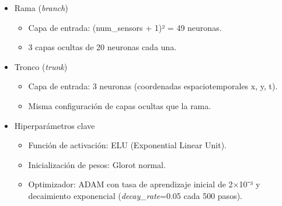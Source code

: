 \documentclass[
  spanish,
  us-letterpaper,
]{scrreprt}
\providecommand{\tightlist}{%
  \setlength{\itemsep}{0pt}\setlength{\parskip}{0pt}}
\theoremstyle{definition}
\theoremstyle{plain}
\theoremstyle{remark}
\begin{document}
\begin{itemize}
\tightlist
\item
  Rama (\emph{branch})

  \begin{itemize}
  \tightlist
  \item
    Capa de entrada: (num\_sensors + 1)² = 49 neuronas.
  \item
    3 capas ocultas de 20 neuronas cada una.
  \end{itemize}
\item
  Tronco (\emph{trunk})

  \begin{itemize}
  \tightlist
  \item
    Capa de entrada: 3 neuronas (coordenadas espaciotemporales x, y, t).
  \item
    Misma configuración de capas ocultas que la rama.
  \end{itemize}
\item
  Hiperparámetros clave

  \begin{itemize}
  \tightlist
  \item
    Función de activación: ELU (Exponential Linear Unit).
  \item
    Inicialización de pesos: Glorot normal.
  \item
    Optimizador: ADAM con tasa de aprendizaje inicial de 2×10⁻³ y
    decaimiento exponencial (\emph{decay\_rate}=0.05 cada 500 pasos).
  \end{itemize}
\end{itemize}
\end{document}
